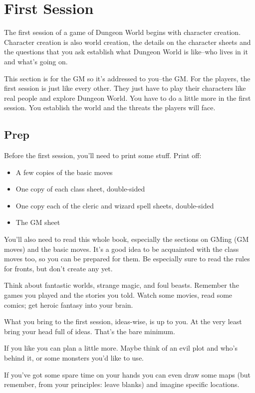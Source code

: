 \chapter{First Session}


 The first session of a game of Dungeon World begins with character creation. Character creation is also world creation, the details on the character sheets and the questions that you ask establish what Dungeon World is like--who lives in it and what's going on.


 This section is for the GM so it's addressed to you--the GM\@. For the players, the first session is just like every other. They just have to play their characters like real people and explore Dungeon World. You have to do a little more in the first session. You establish the world and the threats the players will face.
\section*{Prep}


 Before the first session, you'll need to print some stuff. Print off:
\begin{itemize}
\item A few copies of the basic moves
\item One copy of each class sheet, double-sided
\item One copy each of the cleric and wizard spell sheets, double-sided
\item The GM sheet

\end{itemize}


 You'll also need to read this whole book, especially the sections on GMing (GM moves) and the basic moves. It's a good idea to be acquainted with the class moves too, so you can be prepared for them. Be especially sure to read the rules for fronts, but don't create any yet.


 Think about fantastic worlds, strange magic, and foul beasts. Remember the games you played and the stories you told. Watch some movies, read some comics; get heroic fantasy into your brain.


 What you bring to the first session, ideas-wise, is up to you. At the very least bring your head full of ideas. That's the bare minimum.


 If you like you can plan a little more. Maybe think of an evil plot and who's behind it, or some monsters you'd like to use.


 If you've got some spare time on your hands you can even draw some maps (but remember, from your principles: leave blanks) and imagine specific locations.


